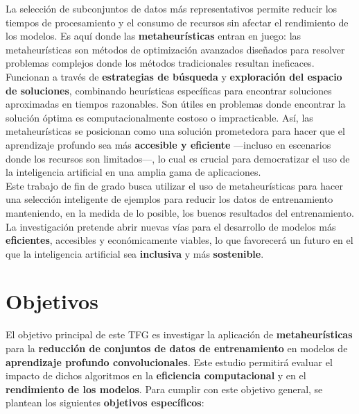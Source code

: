 La selección de subconjuntos de datos más representativos permite reducir los tiempos de procesamiento y el consumo de
recursos sin afectar el rendimiento de los modelos.
Es aquí donde las \textbf{metaheurísticas} entran en juego: las metaheurísticas son métodos de optimización avanzados
diseñados para resolver problemas complejos donde los métodos tradicionales resultan ineficaces.
Funcionan a través de \textbf{estrategias de búsqueda} y \textbf{exploración del espacio de soluciones}, combinando
heurísticas específicas para encontrar soluciones aproximadas en tiempos razonables.
Son útiles en problemas donde encontrar la solución óptima es computacionalmente costoso o impracticable.
Así, las metaheurísticas se posicionan como una solución prometedora para hacer que el aprendizaje profundo sea
más \textbf{accesible y eficiente} —incluso en escenarios donde los recursos son limitados—, lo cual es crucial para
democratizar el uso de la inteligencia artificial en una amplia gama de aplicaciones. \\[6pt]

Este trabajo de fin de grado busca utilizar el uso de metaheurísticas para hacer una selección inteligente de ejemplos
para reducir los datos de entrenamiento manteniendo, en la medida de lo posible, los buenos resultados del
entrenamiento.
La investigación pretende abrir nuevas vías para el desarrollo de modelos más \textbf{eficientes}, accesibles y
económicamente viables, lo que favorecerá un futuro en el que la inteligencia artificial sea \textbf{inclusiva} y más
\textbf{sostenible}. \\[6pt]

\section{Objetivos}\label{sec:objetivos}
El objetivo principal de este TFG es investigar la aplicación de \textbf{metaheurísticas} para la
\textbf{reducción de conjuntos de datos de entrenamiento} en modelos de \textbf{aprendizaje profundo convolucionales}.
Este estudio permitirá evaluar el impacto de dichos algoritmos en la \textbf{eficiencia computacional} y en el
\textbf{rendimiento de los modelos}.
Para cumplir con este objetivo general, se plantean los siguientes \textbf{objetivos específicos}:

